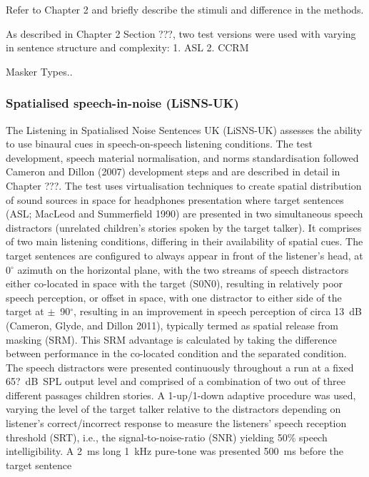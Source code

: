 \documentclass[a4paper,nobind]{templates/ociamthesis}
\begin{document}
Refer to Chapter 2 and briefly describe the stimuli and difference in
the methods.

As described in Chapter 2 Section ???, two test versions were used with
varying in sentence structure and complexity: 1. ASL 2. CCRM

Masker Types..

\hypertarget{spatialised-speech-in-noise-lisns-uk}{%
\subsubsection{Spatialised speech-in-noise
(LiSNS-UK)}\label{spatialised-speech-in-noise-lisns-uk}}

The Listening in Spatialised Noise Sentences UK (LiSNS-UK) assesses the
ability to use binaural cues in speech-on-speech listening conditions.
The test development, speech material normalisation, and norms
standardisation followed Cameron and Dillon (2007) development steps and
are described in detail in Chapter ???. The test uses virtualisation
techniques to create spatial distribution of sound sources in space for
headphones presentation where target sentences (ASL; MacLeod and
Summerfield 1990) are presented in two simultaneous speech distractors
(unrelated children's stories spoken by the target talker). It comprises
of two main listening conditions, differing in their availability of
spatial cues. The target sentences are configured to always appear in
front of the listener's head, at 0\(^{\circ}\) azimuth on the horizontal
plane, with the two streams of speech distractors either co-located in
space with the target (S0N0), resulting in relatively poor speech
perception, or offset in space, with one distractor to either side of
the target at \(\pm\)~90\(^{\circ}\), resulting in an improvement in
speech perception of circa 13~dB (Cameron, Glyde, and Dillon 2011),
typically termed as spatial release from masking (SRM). This SRM
advantage is calculated by taking the difference between performance in
the co-located condition and the separated condition. The speech
distractors were presented continuously throughout a run at a fixed
65?~dB~SPL output level and comprised of a combination of two out of
three different passages children stories. A 1-up/1-down adaptive
procedure was used, varying the level of the target talker relative to
the distractors depending on listener's correct/incorrect response to
measure the listeners' speech reception threshold (SRT), i.e., the
signal-to-noise-ratio (SNR) yielding 50\% speech intelligibility. A 2~ms
long 1~kHz pure-tone was presented 500~ms before the target sentence
\end{document}
